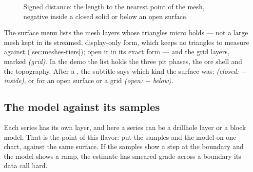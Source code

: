 \begin{figure}[htbp]\centering
{}
\caption{Signed distance: the length to the nearest point of the mesh, negative inside a closed solid or below an open surface.}\label{fig:contact-signed}
\end{figure}

The surface menu lists the mesh layers whose triangles micro holds — not a large mesh kept in its streamed, display-only form, which keeps no triangles to measure against (\cref{sec:meshes-tiers}); open it in its exact form — and the grid layers, marked \emph{(grid)}. In the demo the list holds the three pit phases, the ore shell and the topography. After a , the subtitle says which kind the surface was: \emph{(closed: − inside)}, or for an open surface or a grid \emph{(open: − below)}.

\subsection{The model against its samples}
Each series has its own layer, and here a series can be a drillhole layer or a block model. That is the point of this flavor: put the samples and the model on one chart, against the same surface. If the samples show a step at the boundary and the model shows a ramp, the estimate has smeared grade across a boundary its data call hard.

